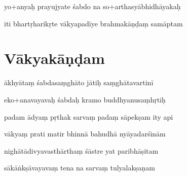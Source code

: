 \documentclass[article,12pt,a4paper]{memoir}%
\newcounter{parCount}
\begin{document}
	  
	  \pstart \leavevmode%
	yo+anyaḥ prayujyate śabdo na so+arthasyābhidhāyakaḥ 
	{}
	\pend%
      

	  
	  \pstart \leavevmode%
	iti bhartṛharikṛte vākyapadīye brahmakāṇḍaṃ samāptam
	{}
	\pend%
      
	    
	    \endnumbering%
	    
	  
	  
	
	    
	    \beginnumbering%
	    
	  
\chapter[{Vākyakāṇḍam}][{Vākyakāṇḍam}]{Vākyakāṇḍam}

	  
	  \pstart {} ākhyātaṃ śabdasaṃghāto jātiḥ saṃghātavartinī 
	{}
	\pend%
      

	  
	  \pstart \leavevmode%
	eko+anavayavaḥ śabdaḥ kramo buddhyanusaṃhṛtiḥ 
	{}
	\pend%
      

	  
	  \pstart {} padam ādyaṃ pṛthak sarvaṃ padaṃ sāpekṣam ity api 
	{}
	\pend%
      

	  
	  \pstart \leavevmode%
	vākyaṃ prati matir bhinnā bahudhā nyāyadarśinām 
	{}
	\pend%
      

	  
	  \pstart {} nighātādivyavasthārthaṃ śāstre yat paribhāṣitam 
	{}
	\pend%
      

	  
	  \pstart \leavevmode%
	sākāṅkṣāvayavaṃ tena na sarvaṃ tulyalakṣaṇam 
	{}
	\pend%
      
\end{document}
